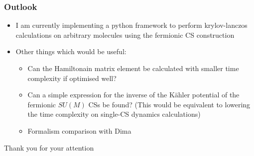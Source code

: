 \documentclass[english]{beamer}
\begin{document}
  \begin{frame}
  	\frametitle{Outlook}
  	\begin{itemize}
  		\item I am currently implementing a python framework to perform krylov-lanczos calculations on arbitrary molecules using the fermionic CS construction
  		\item Other things which would be useful:
  		\begin{itemize}
  			\item Can the Hamiltonain matrix element be calculated with smaller time complexity if optimised well?
  			\item Can a simple expression for the inverse of the Kähler potential of the fermionic $SU(M)$ CSs be found? (This would be equivalent to lowering the time complexity on single-CS dynamics calculations)
  			\item Formalism comparison with Dima
  		\end{itemize}
  	\end{itemize}
  \end{frame}
  
  \begin{frame}[plain,c]
  	\begin{center}
  	  \Huge Thank you for your attention
  	\end{center}
  \end{frame}
\end{document}
